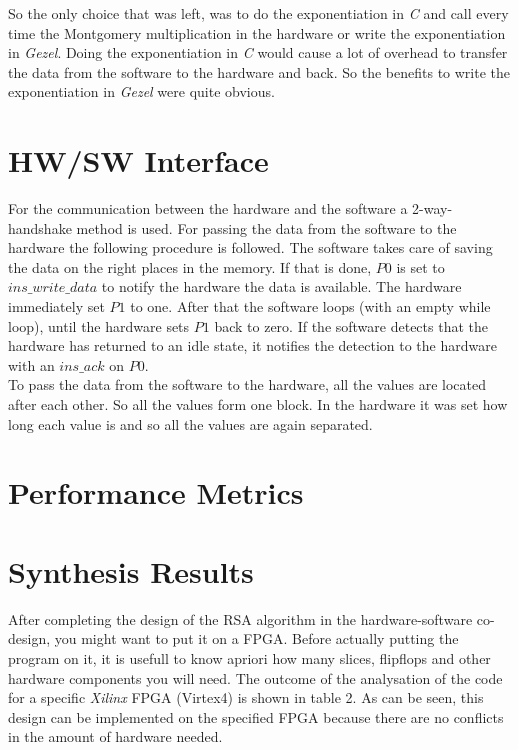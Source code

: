 \documentclass[a4paper]{article}
\begin{document}
So the only choice that was left, was to do the exponentiation in \textit{C} and call every time the Montgomery multiplication in the hardware or write the exponentiation in \textit{Gezel}. Doing the exponentiation in \textit{C} would cause a lot of overhead to transfer the data from the software to the hardware and back. So the benefits to write the exponentiation in \textit{Gezel} were quite obvious.

\section{HW/SW Interface}

For the communication between the hardware and the software a 2-way-handshake method is used. For passing the data from the software to the hardware the following procedure is followed. The software takes care of saving the data on the right places in the memory. If that is done, $P0$ is set to $ins\_write\_data$ to notify the hardware the data is available. The hardware immediately set $P1$ to one. After that the software loops (with an empty while loop), until the hardware sets $P1$ back to zero. If the software detects that the hardware has returned to an idle state, it notifies the detection to the hardware with an $ins\_ack$ on $P0$.\\

To pass the data from the software to the hardware, all the values are located after each other. So all the values form one block. In the hardware it was set how long each value is and so all the values are again separated.

\section{Performance Metrics}


\section{Synthesis Results}

After completing the design of the RSA algorithm in the hardware-software co-design, you might want to put it on a FPGA. Before actually putting the program on it, it is usefull to know apriori how many slices, flipflops and other hardware components you will need. The outcome of the analysation of the code for a specific \textit{Xilinx} FPGA (Virtex4) is shown in table 2. As can be seen, this design can be implemented on the specified FPGA because there are no conflicts in the amount of hardware needed.
\end{document}
